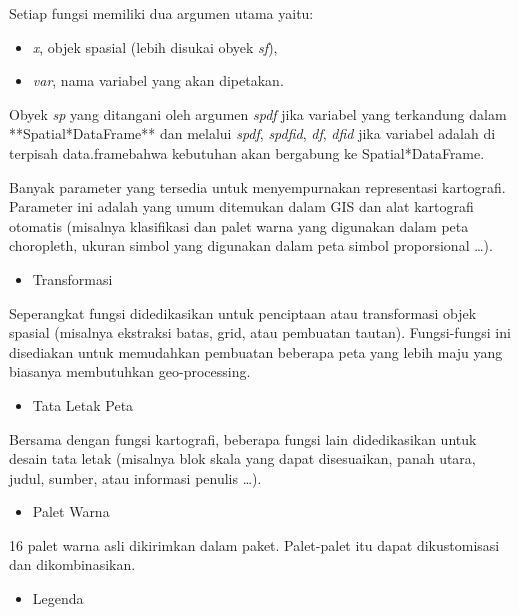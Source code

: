 \documentclass[]{book}
\providecommand{\tightlist}{%
  \setlength{\itemsep}{0pt}\setlength{\parskip}{0pt}}
\begin{document}
Setiap fungsi memiliki dua argumen utama yaitu:

\begin{itemize}
\tightlist
\item
  \emph{x}, objek spasial (lebih disukai obyek \emph{sf}),
\item
  \emph{var}, nama variabel yang akan dipetakan.
\end{itemize}

Obyek \emph{sp} yang ditangani oleh argumen \emph{spdf} jika variabel yang terkandung dalam **Spatial*DataFrame** dan melalui \emph{spdf}, \emph{spdfid}, \emph{df}, \emph{dfid} jika variabel adalah di terpisah data.framebahwa kebutuhan akan bergabung ke Spatial*DataFrame.

Banyak parameter yang tersedia untuk menyempurnakan representasi kartografi. Parameter ini adalah yang umum ditemukan dalam GIS dan alat kartografi otomatis (misalnya klasifikasi dan palet warna yang digunakan dalam peta choropleth, ukuran simbol yang digunakan dalam peta simbol proporsional \ldots{}).

\begin{itemize}
\tightlist
\item
  Transformasi
\end{itemize}

Seperangkat fungsi didedikasikan untuk penciptaan atau transformasi objek spasial (misalnya ekstraksi batas, grid, atau pembuatan tautan). Fungsi-fungsi ini disediakan untuk memudahkan pembuatan beberapa peta yang lebih maju yang biasanya membutuhkan geo-processing.

\begin{itemize}
\tightlist
\item
  Tata Letak Peta
\end{itemize}

Bersama dengan fungsi kartografi, beberapa fungsi lain didedikasikan untuk desain tata letak (misalnya blok skala yang dapat disesuaikan, panah utara, judul, sumber, atau informasi penulis \ldots{}).

\begin{itemize}
\tightlist
\item
  Palet Warna
\end{itemize}

16 palet warna asli dikirimkan dalam paket. Palet-palet itu dapat dikustomisasi dan dikombinasikan.

\begin{itemize}
\tightlist
\item
  Legenda
\end{itemize}
\end{document}
